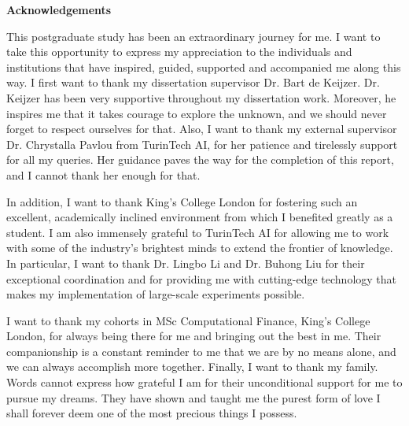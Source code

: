 \begin{center}

    \vspace*{2cm}

    {\textbf{Acknowledgements}}
    
    \vspace*{1cm}

\end{center}

This postgraduate study has been an extraordinary journey for me. I want to take this opportunity to express my appreciation to the individuals and institutions that have inspired, guided, supported and accompanied me along this way. I first want to thank my dissertation supervisor Dr. Bart de Keijzer. Dr. Keijzer has been very supportive throughout my dissertation work. Moreover, he inspires me that it takes courage to explore the unknown, and we should never forget to respect ourselves for that. Also, I want to thank my external supervisor Dr. Chrystalla Pavlou from TurinTech AI, for her patience and tirelessly support for all my queries. Her guidance paves the way for the completion of this report, and I cannot thank her enough for that.

In addition, I want to thank King's College London for fostering such an excellent, academically inclined environment from which I benefited greatly as a student. I am also immensely grateful to TurinTech AI for allowing me to work with some of the industry's brightest minds to extend the frontier of knowledge. In particular, I want to thank Dr. Lingbo Li and Dr. Buhong Liu for their exceptional coordination and for providing me with cutting-edge technology that makes my implementation of large-scale experiments possible.

I want to thank my cohorts in MSc Computational Finance, King's College London, for always being there for me and bringing out the best in me. Their companionship is a constant reminder to me that we are by no means alone, and we can always accomplish more together. Finally, I want to thank my family. Words cannot express how grateful I am for their unconditional support for me to pursue my dreams. They have shown and taught me the purest form of love I shall forever deem one of the most precious things I possess.

\newpage
